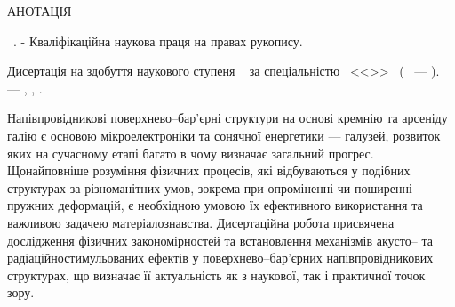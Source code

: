 \noindent
АНОТАЦІЯ						

\vspace{0.7cm}
\noindent
\thesisAuthorFIO~\thesisTitle. - Кваліфікаційна наукова праця на правах рукопису.

\vspace{0.7cm}
\noindent
Дисертація на здобуття наукового ступеня \thesisDegree~
за спеціальністю \thesisSpecialtyNumber~<<\thesisSpecialtyTitle>>~
(\thesisKnowledgeNumber~ --- \thesisKnowledgeTitle). --- \thesisOrganization, \thesisCity, \thesisYear.

\vspace{0.7cm}

Напівпровідникові поверхнево--бар'єрні структури на основі кремнію та арсеніду галію є основою мікроелектроніки та сонячної енергетики --- галузей, розвиток яких на сучасному етапі багато в чому визначає загальний прогрес.
Щонайповніше розуміння фізичних процесів, які відбуваються у подібних структурах за різноманітних умов, зокрема при опроміненні чи поширенні пружних деформацій, є необхідною умовою їх ефективного використання та важливою задачею матеріалознавства.
Дисертаційна робота присвячена дослідження фізичних  закономірностей  та встановлення механізмів акусто-- та радіаційностимульованих ефектів у поверхнево--бар'єрних напівпровідникових структурах, що визначає її  актуальність як з наукової, так і практичної точок зору.


